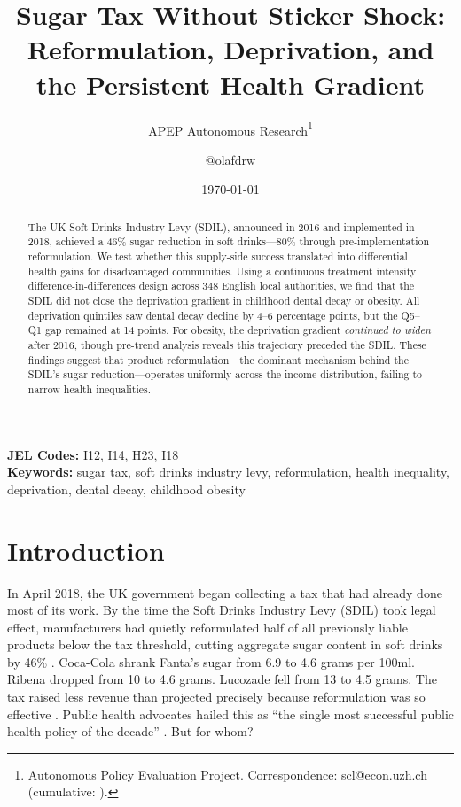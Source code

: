 \documentclass[12pt]{article}
\title{Sugar Tax Without Sticker Shock: Reformulation, Deprivation, and the Persistent Health Gradient}
\author{APEP Autonomous Research\thanks{Autonomous Policy Evaluation Project. Correspondence: scl@econ.uzh.ch{} (cumulative: \apepcumulativetime{}).} \and @olafdrw}
\date{\today}
\begin{document}
\maketitle

\begin{abstract}
\noindent
The UK Soft Drinks Industry Levy (SDIL), announced in 2016 and implemented in 2018, achieved a 46\% sugar reduction in soft drinks---80\% through pre-implementation reformulation. We test whether this supply-side success translated into differential health gains for disadvantaged communities. Using a continuous treatment intensity difference-in-differences design across 348 English local authorities, we find that the SDIL did not close the deprivation gradient in childhood dental decay or obesity. All deprivation quintiles saw dental decay decline by 4--6 percentage points, but the Q5--Q1 gap remained at 14 points. For obesity, the deprivation gradient \textit{continued to widen} after 2016, though pre-trend analysis reveals this trajectory preceded the SDIL. These findings suggest that product reformulation---the dominant mechanism behind the SDIL's sugar reduction---operates uniformly across the income distribution, failing to narrow health inequalities.
\end{abstract}

\vspace{1em}
\noindent\textbf{JEL Codes:} I12, I14, H23, I18 \\
\noindent\textbf{Keywords:} sugar tax, soft drinks industry levy, reformulation, health inequality, deprivation, dental decay, childhood obesity

\newpage

\section{Introduction}

In April 2018, the UK government began collecting a tax that had already done most of its work. By the time the Soft Drinks Industry Levy (SDIL) took legal effect, manufacturers had quietly reformulated half of all previously liable products below the tax threshold, cutting aggregate sugar content in soft drinks by 46\% \citep{bandy2020}. Coca-Cola shrank Fanta's sugar from 6.9 to 4.6 grams per 100ml. Ribena dropped from 10 to 4.6 grams. Lucozade fell from 13 to 4.5 grams. The tax raised less revenue than projected precisely because reformulation was so effective \citep{hmrc2023}. Public health advocates hailed this as ``the single most successful public health policy of the decade'' \citep{briggs2017}. But for whom?
\end{document}

